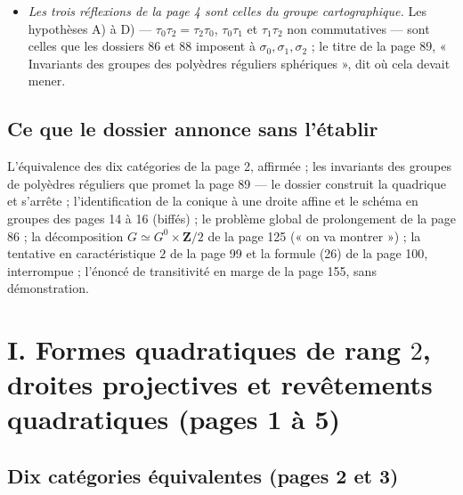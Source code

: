 \documentclass[11pt,a4paper]{article}
\begin{document}
\begin{itemize}
{    involutions $\sigma$ de la page 5.} Les éléments $\sigma$ d'une algèbre de
    quaternions, de trace nulle et de déterminant $-1$ (donc $\sigma^2 = 1$),
    sont les points de la quadrique $\Sigma$ des pages 108 et 109 ; la page 5
    les met en bijection avec les diviseurs étales de degré $2$ de la conique,
    les pages 89 à 116 avec les couples ordonnés de points distincts de la
    conique. Les deux énoncés se correspondent : $\sigma$ et $-\sigma$ donnent
    la même réflexion et les deux ordres d'un même couple.
  \item \emph{Les trois réflexions de la page 4 sont celles du groupe
    cartographique.} Les hypothèses A) à D) — $\tau_0\tau_2 = \tau_2\tau_0$,
    $\tau_0\tau_1$ et $\tau_1\tau_2$ non commutatives — sont celles que les
    dossiers 86 et 88 imposent à $\sigma_0, \sigma_1, \sigma_2$ ; le titre
    de la page 89, « Invariants des groupes des polyèdres réguliers
    sphériques », dit où cela devait mener.
\end{itemize}

\subsection*{Ce que le dossier annonce sans l'établir}

L'équivalence des dix catégories de la page 2, affirmée ; les invariants des
groupes de polyèdres réguliers que promet la page 89 — le dossier construit la
quadrique et s'arrête ; l'identification de la conique à une droite affine et
le schéma en groupes des pages 14 à 16 (biffés) ; le problème global de
prolongement de la page 86 ; la décomposition $G \simeq G^0 \times \mathbf{Z}/2$ de
la page 125 (« on va montrer ») ; la tentative en caractéristique $2$ de la
page 99 et la formule (26) de la page 100, interrompue ; l'énoncé de
transitivité en marge de la page 155, sans démonstration.

\section*{I. Formes quadratiques de rang $2$, droites projectives et revêtements quadratiques (pages 1 à 5)}

\subsection*{Dix catégories équivalentes (pages 2 et 3)}
\end{document}
